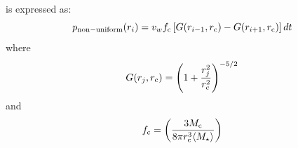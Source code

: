 \documentclass[fleqn,usenatbib]{mnras}
\begin{document}
is expressed as:
\begin{equation}
p_{\rm non-uniform}(r_i) = 
v_w f_{\rm c} \left[G(r_{i-1},r_{\rm c}) - G(r_{i+1}, r_{\rm c})  \right] dt
\label{eq:nonuni}
\end{equation}
where
\begin{equation}
G(r_j, r_{\rm c}) = \left( 1 + \frac{r_{j}^2}{r_{\rm c}^2} \right)^{-5/2} 
\end{equation}
and
\begin{equation}
f_{\rm c} = \left( \frac{3 M_{\rm c}}{8 \pi r_{\rm c}^3 \langle M_\star \rangle} \right)
\end{equation}
\end{document}
